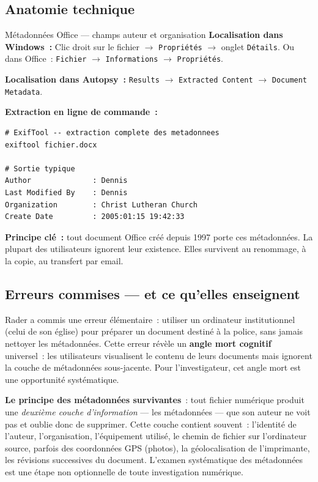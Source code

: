 \subsection{Anatomie technique}

\begin{boxartefact}{Métadonnées Office --- champs auteur et organisation}
\textbf{Localisation dans Windows~:}
Clic droit sur le fichier $\to$ \texttt{Propriétés} $\to$
onglet \texttt{Détails}. Ou dans Office~: \texttt{Fichier} $\to$
\texttt{Informations} $\to$ \texttt{Propriétés}.

\textbf{Localisation dans Autopsy~:}
\texttt{Results} $\to$ \texttt{Extracted Content} $\to$
\texttt{Document Metadata}.

\textbf{Extraction en ligne de commande~:}
\begin{lstlisting}[language=bash_forensique]
# ExifTool -- extraction complete des metadonnees
exiftool fichier.docx

# Sortie typique
Author              : Dennis
Last Modified By    : Dennis
Organization        : Christ Lutheran Church
Create Date         : 2005:01:15 19:42:33
\end{lstlisting}

\textbf{Principe clé~:} tout document Office créé depuis 1997 porte ces
métadonnées. La plupart des utilisateurs ignorent leur existence.
Elles survivent au renommage, à la copie, au transfert par email.
\end{boxartefact}

\subsection{Erreurs commises --- et ce qu'elles enseignent}

Rader a commis une erreur élémentaire~: utiliser un ordinateur institutionnel
(celui de son église) pour préparer un document destiné à la police, sans
jamais nettoyer les métadonnées. Cette erreur révèle un \textbf{angle mort
cognitif} universel~: les utilisateurs visualisent le contenu de leurs
documents mais ignorent la couche de métadonnées sous-jacente. Pour
l'investigateur, cet angle mort est une opportunité systématique.

\begin{boxalert}
\textbf{Le principe des métadonnées survivantes}~: tout fichier numérique
produit une \emph{deuxième couche d'information} --- les métadonnées --- que
son auteur ne voit pas et oublie donc de supprimer. Cette couche contient
souvent~: l'identité de l'auteur, l'organisation, l'équipement utilisé,
le chemin de fichier sur l'ordinateur source, parfois des coordonnées GPS
(photos), la géolocalisation de l'imprimante, les révisions successives du
document. L'examen systématique des métadonnées est une étape non
optionnelle de toute investigation numérique.
\end{boxalert}

